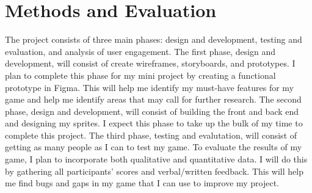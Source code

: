 \documentclass[10pt,twocolumn]{article}
\begin{document}
\section{Methods and Evaluation}
The project consists of three main phases: design and development, testing and evaluation, and analysis of user engagement. The first phase, design and development, will consist of create wireframes, storyboards, and prototypes. I plan to complete this phase for my mini project by creating a functional prototype in Figma. This will help me identify my must-have features for my game and help me identify areas that may call for further research. 
The second phase, design and development, will consist of building the front and back end and designing my sprites. I expect this phase to take up the bulk of my time to complete this project. 
The third phase, testing and evalutation, will consist of getting as many people as I can to test my game. To evaluate the results of my game, I plan to incorporate both qualitative and quantitative data. I will do this by gathering all participants' scores and verbal/written feedback. This will help me find bugs and gaps in my game that I can use to improve my project.  
\end{document}

